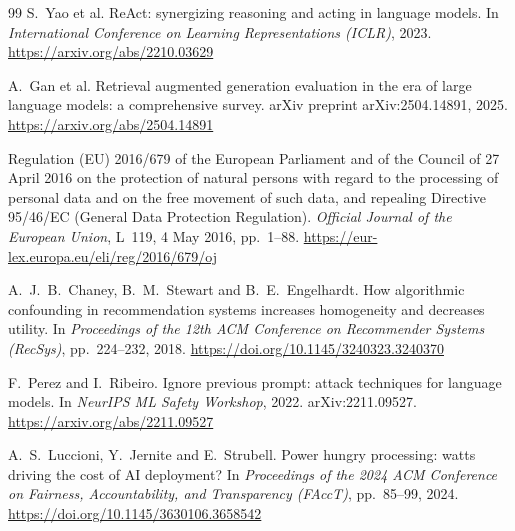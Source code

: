 \documentclass[a4paper,10pt]{article}
\begin{document}
\begin{thebibliography}{99}
	 S.~Yao et al. ReAct: synergizing reasoning and acting in language models. In \emph{International Conference on Learning Representations (ICLR)}, 2023. \url{https://arxiv.org/abs/2210.03629}

	 A.~Gan et al. Retrieval augmented generation evaluation in the era of large language models: a comprehensive survey. arXiv preprint arXiv:2504.14891, 2025. \url{https://arxiv.org/abs/2504.14891}

	 Regulation (EU) 2016/679 of the European Parliament and of the Council of 27 April 2016 on the protection of natural persons with regard to the processing of personal data and on the free movement of such data, and repealing Directive 95/46/EC (General Data Protection Regulation). \emph{Official Journal of the European Union}, L~119, 4 May 2016, pp.~1--88. \url{https://eur-lex.europa.eu/eli/reg/2016/679/oj}

	 A.~J.~B.~Chaney, B.~M.~Stewart and B.~E.~Engelhardt. How algorithmic confounding in recommendation systems increases homogeneity and decreases utility. In \emph{Proceedings of the 12th ACM Conference on Recommender Systems (RecSys)}, pp.~224--232, 2018. \url{https://doi.org/10.1145/3240323.3240370}

	 F.~Perez and I.~Ribeiro. Ignore previous prompt: attack techniques for language models. In \emph{NeurIPS ML Safety Workshop}, 2022. arXiv:2211.09527. \url{https://arxiv.org/abs/2211.09527}

	 A.~S.~Luccioni, Y.~Jernite and E.~Strubell. Power hungry processing: watts driving the cost of AI deployment? In \emph{Proceedings of the 2024 ACM Conference on Fairness, Accountability, and Transparency (FAccT)}, pp.~85--99, 2024. \url{https://doi.org/10.1145/3630106.3658542}

\end{thebibliography}



%
%
%
\end{document}
